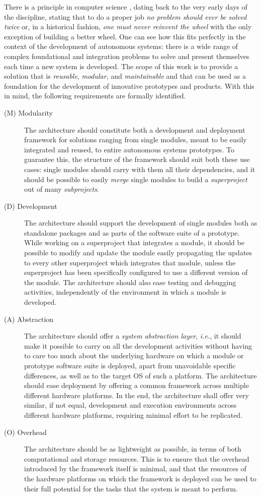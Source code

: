 There is a principle in computer science \cite{raymond_how_2001}, dating back to the very early days of the discipline, stating that to do a proper job \emph{no problem should ever be solved twice} or, in a historical fashion, \emph{one must never reinvent the wheel} with the only exception of building a better wheel. One can see how this fits perfectly in the context of the development of autonomous systems: there is a wide range of complex foundational and integration problems to solve and present themselves each time a new system is developed. The scope of this work is to provide a solution that is \emph{reusable}, \emph{modular}, and \emph{maintainable} and that can be used as a foundation for the development of innovative prototypes and products. With this in mind, the following requirements are formally identified.
\begin{description}
  \item[(M) Modularity] The architecture should constitute both a development and deployment framework for solutions ranging from single modules, meant to be easily integrated and reused, to entire autonomous systems prototypes. To guarantee this, the structure of the framework should suit both these use cases: single modules should carry with them all their dependencies, and it should be possible to easily \emph{merge} single modules to build a \emph{superproject} out of many \emph{subprojects}.
  \item[(D) Development] The architecture should support the development of single modules both as standalone packages and as parts of the software suite of a prototype. While working on a superproject that integrates a module, it should be possible to modify and update the module easily propagating the updates to every other superproject which integrates that module, unless the superproject has been specifically configured to use a different version of the module. The architecture should also ease testing and debugging activities, independently of the environment in which a module is developed.
  \item[(A) Abstraction] The architecture should offer a \emph{system abstraction layer}, \emph{i.e.}, it should make it possible to carry on all the development activities without having to care too much about the underlying hardware on which a module or prototype software suite is deployed, apart from unavoidable specific differences, as well as to the target OS of such a platform. The architecture should ease deployment by offering a common framework across multiple different hardware platforms. In the end, the architecture shall offer very similar, if not equal, development and execution environments across different hardware platforms, requiring minimal effort to be replicated.
  \item[(O) Overhead] The architecture should be as lightweight as possible, in terms of both computational and storage resources. This is to ensure that the overhead introduced by the framework itself is minimal, and that the resources of the hardware platforms on which the framework is deployed can be used to their full potential for the tasks that the system is meant to perform.
\end{description}
